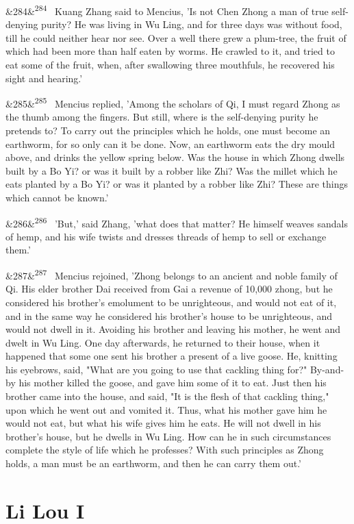 \documentclass[12pt]{article}
\newcommand{\para}[1][]{\par\noindent\ifx&#1&\else\textsuperscript{\footnotesize #1}~\fi}
\begin{document}
\para[284] Kuang Zhang said to Mencius, 'Is not Chen Zhong a man of true self-denying purity? He was living in Wu Ling, and for three days was without food, till he could neither hear nor see. Over a well there grew a plum-tree, the fruit of which had been more than half eaten by worms. He crawled to it, and tried to eat some of the fruit, when, after swallowing three mouthfuls, he recovered his sight and hearing.'

\para[285] Mencius replied, 'Among the scholars of Qi, I must regard Zhong as the thumb among the fingers. But still, where is the self-denying purity he pretends to? To carry out the principles which he holds, one must become an earthworm, for so only can it be done. Now, an earthworm eats the dry mould above, and drinks the yellow spring below. Was the house in which Zhong dwells built by a Bo Yi? or was it built by a robber like Zhi? Was the millet which he eats planted by a Bo Yi? or was it planted by a robber like Zhi? These are things which cannot be known.'

\para[286] 'But,' said Zhang, 'what does that matter? He himself weaves sandals of hemp, and his wife twists and dresses threads of hemp to sell or exchange them.'

\para[287] Mencius rejoined, 'Zhong belongs to an ancient and noble family of Qi. His elder brother Dai received from Gai a revenue of 10,000 zhong, but he considered his brother's emolument to be unrighteous, and would not eat of it, and in the same way he considered his brother's house to be unrighteous, and would not dwell in it. Avoiding his brother and leaving his mother, he went and dwelt in Wu Ling. One day afterwards, he returned to their house, when it happened that some one sent his brother a present of a live goose. He, knitting his eyebrows, said, "What are you going to use that cackling thing for?" By-and-by his mother killed the goose, and gave him some of it to eat. Just then his brother came into the house, and said, "It is the flesh of that cackling thing," upon which he went out and vomited it. Thus, what his mother gave him he would not eat, but what his wife gives him he eats. He will not dwell in his brother's house, but he dwells in Wu Ling. How can he in such circumstances complete the style of life which he professes? With such principles as Zhong holds, a man must be an earthworm, and then he can carry them out.'

\section*{Li Lou I}
\end{document}

